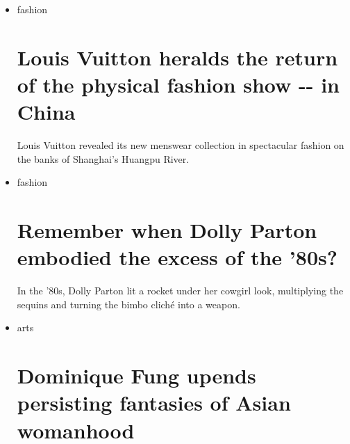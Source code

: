 \begin{itemize}
\item
  \href{/style/fashion}{}

  fashion

  \href{/style/article/louis-vuitton-ss21-shanghai/index.html}{}

  \hypertarget{louis-vuitton-heralds-the-return-of-the-physical-fashion-show----in-china-1}{%
  \section{Louis Vuitton heralds the return of the physical fashion show
  -\/- in
  China}\label{louis-vuitton-heralds-the-return-of-the-physical-fashion-show----in-china-1}}

  \href{/style/article/louis-vuitton-ss21-shanghai/index.html}{}

  Louis Vuitton revealed its new menswear collection in spectacular
  fashion on the banks of Shanghai's Huangpu River.
\item
  \href{/style/fashion}{}

  fashion

  \href{/style/article/remember-when-dolly-parton/index.html}{}

  \hypertarget{remember-when-dolly-parton-embodied-the-excess-of-the-80s}{%
  \section{Remember when Dolly Parton embodied the excess of the
  '80s?}\label{remember-when-dolly-parton-embodied-the-excess-of-the-80s}}

  \href{/style/article/remember-when-dolly-parton/index.html}{}

  In the '80s, Dolly Parton lit a rocket under her cowgirl look,
  multiplying the sequins and turning the bimbo cliché into a weapon.
\item
  \href{/style/arts}{}

  arts

  \href{/style/article/dominique-fung-paintings-artsy/index.html}{}

  \hypertarget{dominique-fung-upends-persisting-fantasies-of-asian-womanhood}{%
  \section{Dominique Fung upends persisting fantasies of Asian
  womanhood}\label{dominique-fung-upends-persisting-fantasies-of-asian-womanhood}}


\end{itemize}

